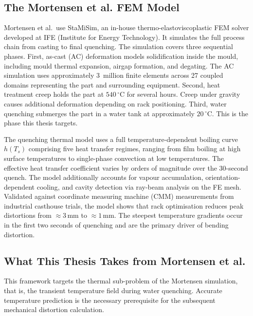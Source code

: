 \subsection{The Mortensen et al. FEM Model}

Mortensen et al.\ use StaMiSim, an in-house thermo-elastoviscoplastic FEM
solver developed at IFE (Institute for Energy Technology).
It simulates the full process chain from casting to final quenching.
The simulation covers three sequential phases.
First, as-cast (AC) deformation models solidification inside the mould,
including mould thermal expansion, airgap formation, and degating.
The AC simulation uses approximately 3~million finite elements across 27 coupled
domains representing the part and surrounding equipment.
Second, heat treatment creep holds the part at $540\,^\circ\mathrm{C}$ for
several hours.
Creep under gravity causes additional deformation depending on rack positioning.
Third, water quenching submerges the part in a water tank at approximately
$20\,^\circ\mathrm{C}$.
This is the phase this thesis targets.

The quenching thermal model uses a full temperature-dependent boiling curve
$h(T_s)$ comprising five heat transfer regimes, ranging from film boiling at
high surface temperatures to single-phase convection at low temperatures.
The effective heat transfer coefficient varies by orders of magnitude over the
30-second quench.
The model additionally accounts for vapour accumulation, orientation-dependent
cooling, and cavity detection via ray-beam analysis on the FE mesh.
Validated against coordinate measuring machine (CMM) measurements from
industrial casthouse trials, the model shows that rack optimisation reduces
peak distortions from ${\approx}3\,\mathrm{mm}$ to ${\approx}1\,\mathrm{mm}$.
The steepest temperature gradients occur in the first two seconds of quenching
and are the primary driver of bending distortion.

\subsection{What This Thesis Takes from Mortensen et al.}

This framework targets the thermal sub-problem of the Mortensen simulation,
that is, the transient temperature field during water quenching.
Accurate temperature prediction is the necessary prerequisite for the
subsequent mechanical distortion calculation.

